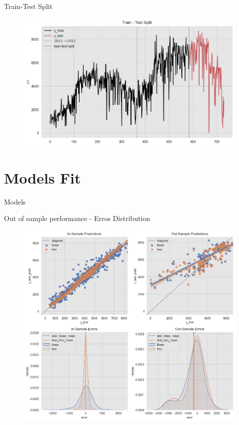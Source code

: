\documentclass[10pt]{beamer}
\begin{document}
\begin{frame}{Train-Test Split}
\begin{center}
  \begin{figure}
    \includegraphics[scale=0.5]{images/interpretable_ml_25_0.png} 
  \end{figure}
\end{center}
\end{frame}

\section{Models Fit}

\begin{frame}{Models}
\end{frame}

\begin{frame}{Out of sample performance - Erros Distribution}
\begin{center}
  \begin{figure}
    \includegraphics[scale=0.35]{images/interpretable_ml_44_0.png} 
  \end{figure}
\end{center}
\end{frame}
\end{document}
